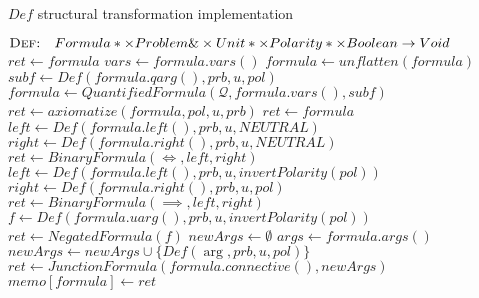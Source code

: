 \begin{algorithm}[H]
  \caption{\(Def\) structural transformation implementation}\label{alg:def}
    \begin{algorithmic}[1]
        \Statex{}  \(\textsc{Def:}\quad Formula*\times Problem\&\times Unit*\times Polarity*\times Boolean\to Void\)
            \State{} \(ret \gets formula\)
              \State{} 
            \EndIf{}
              \Case{\(\forall,\exists\)}
                \State{} \(vars \gets formula.vars()\)
                \State{} \(formula \gets unflatten(formula)\)
                \State{} \(subf \gets Def(formula.qarg(),prb,u,pol)\)
                \State{} \(formula \gets QuantifiedFormula(\mathcal{Q},formula.vars(),subf)\)
                  \State{} \(ret \gets axiomatize(formula, pol, u, prb)\)
                \Else{}
                  \State{} \(ret \gets formula\)
                \EndIf{}
              \EndCase{}
              \Case{\(\iff\)}
                \State{} \(left \gets Def(formula.left(), prb,u,NEUTRAL)\)
                \State{} \(right \gets Def(formula.right(), prb,u,NEUTRAL)\)
                \State{} \(ret \gets BinaryFormula(\iff,left,right)\)
              \EndCase{}
              \Case{\(\implies\)}
                \State{} \(left \gets Def(formula.left(), prb,u,invertPolarity(pol))\)
                \State{} \(right \gets Def(formula.right(), prb,u,pol)\)
                \State{} \(ret \gets BinaryFormula(\implies,left,right)\)
              \EndCase{}
              \Case{\(\neg\)}
                \State{} \(f \gets Def(formula.uarg(),prb,u,invertPolarity(pol))\)
                \State{} \(ret \gets NegatedFormula(f)\)
              \EndCase{}
              \Case{\(\lor, \land\)}
                \State{} \(newArgs \gets \emptyset\)
                \State{} \(args \gets formula.args()\)
                  \State{} \(newArgs \gets newArgs \cup \{Def(\arg,prb,u,pol)\}\)
                \EndFor{}
                \State{} \(ret \gets JunctionFormula(formula.connective(),newArgs)\)
              \EndCase{}
            \EndSwitch{}
            \State{} \(memo[formula] \gets ret\)
            \State{} 
        \EndFunction{}
    \end{algorithmic}
\end{algorithm}

